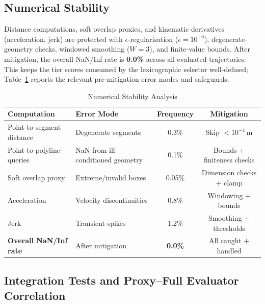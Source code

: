 \subsection{Numerical Stability}
\label{subsec:numerical_stability}

Distance computations, soft overlap proxies, and kinematic derivatives (acceleration, jerk) are protected with $\epsilon$-regularisation ($\epsilon{=}10^{-6}$), degenerate-geometry checks, windowed smoothing ($W{=}3$), and finite-value bounds.  After mitigation, the overall NaN/Inf rate is \textbf{0.0\%} across all evaluated trajectories.  This keeps the tier scores consumed by the lexicographic selector well-defined; Table~\ref{tab:numerical_stability} reports the relevant pre-mitigation error modes and safeguards.

\begin{table}
\centering
\caption{Numerical Stability Analysis}
\label{tab:numerical_stability}
\begin{tabular}{llcc}
\toprule
\textbf{Computation} & \textbf{Error Mode} & \textbf{Frequency} & \textbf{Mitigation} \\
\midrule
Point-to-segment distance & Degenerate segments & 0.3\% & Skip $<\!10^{-4}$\,m \\
Point-to-polyline queries & NaN from ill-conditioned geometry & 0.1\% & Bounds + finiteness checks \\
Soft overlap proxy & Extreme/invalid boxes & 0.05\% & Dimension checks + clamp \\
Acceleration & Velocity discontinuities & 0.8\% & Windowing + bounds \\
Jerk & Transient spikes & 1.2\% & Smoothing + thresholds \\
\midrule
\textbf{Overall NaN/Inf rate} & After mitigation & \textbf{0.0\%} & All caught + handled \\
\bottomrule
\end{tabular}
\end{table}

\subsection{Integration Tests and Proxy--Full Evaluator Correlation}
\label{subsec:integration_tests}

